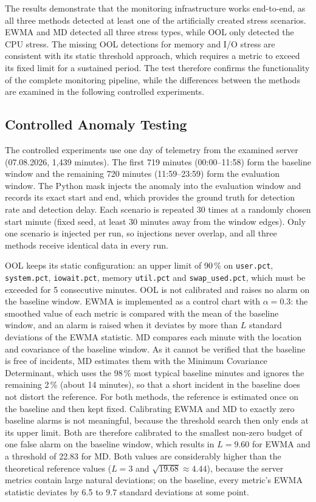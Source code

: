 The results demonstrate that the monitoring infrastructure works end-to-end, as all three methods detected at least one of the artificially created stress scenarios. EWMA and MD detected all three stress types, while OOL only detected the CPU stress. The missing OOL detections for memory and I/O stress are consistent with its static threshold approach, which requires a metric to exceed its fixed limit for a sustained period. The test therefore confirms the functionality of the complete monitoring pipeline, while the differences between the methods are examined in the following controlled experiments.

\subsection{Controlled Anomaly Testing}
\label{sec:controlled}
The controlled experiments use one day of telemetry from the examined server (07.08.2026, 1{,}439 minutes). The first 719 minutes (00:00--11:58) form the baseline window and the remaining 720 minutes (11:59--23:59) form the evaluation window. The Python mask injects the anomaly into the evaluation window and records its exact start and end, which provides the ground truth for detection rate and detection delay. Each scenario is repeated 30 times at a randomly chosen start minute (fixed seed, at least 30 minutes away from the window edges). Only one scenario is injected per run, so injections never overlap, and all three methods receive identical data in every run.

OOL keeps its static configuration: an upper limit of 90\,\% on \texttt{user.pct}, \texttt{system.pct}, \texttt{iowait.pct}, memory \texttt{util.pct} and \texttt{swap\_used.pct}, which must be exceeded for 5 consecutive minutes. OOL is not calibrated and raises no alarm on the baseline window. EWMA is implemented as a control chart with $\alpha = 0.3$: the smoothed value of each metric is compared with the mean of the baseline window, and an alarm is raised when it deviates by more than $L$ standard deviations of the EWMA statistic. MD compares each minute with the location and covariance of the baseline window. As it cannot be verified that the baseline is free of incidents, MD estimates them with the Minimum Covariance Determinant, which uses the 98\,\% most typical baseline minutes and ignores the remaining 2\,\% (about 14 minutes), so that a short incident in the baseline does not distort the reference. For both methods, the reference is estimated once on the baseline and then kept fixed. Calibrating EWMA and MD to exactly zero baseline alarms is not meaningful, because the threshold search then only ends at its upper limit. Both are therefore calibrated to the smallest non-zero budget of one false alarm on the baseline window, which results in $L = 9.60$ for EWMA and a threshold of 22.83 for MD. Both values are considerably higher than the theoretical reference values ($L=3$ and $\sqrt{19.68} \approx 4.44$), because the server metrics contain large natural deviations; on the baseline, every metric's EWMA statistic deviates by 6.5 to 9.7 standard deviations at some point.

